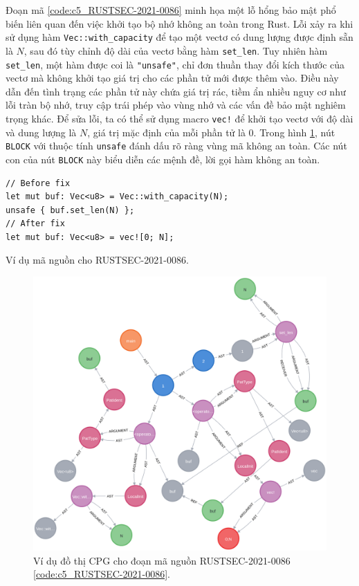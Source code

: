 Đoạn mã \ref{code:c5_RUSTSEC-2021-0086} minh họa một lỗ hổng bảo mật phổ biến liên quan đến việc khởi tạo bộ nhớ không an toàn trong Rust.
Lỗi xảy ra khi sử dụng hàm \texttt{Vec::with\_capacity} để tạo một vectơ có dung lượng được định sẵn là $N$, sau đó tùy chỉnh độ dài của vectơ bằng hàm \texttt{set\_len}.
Tuy nhiên hàm \texttt{set\_len}, một hàm được coi là \texttt{"unsafe"}, chỉ đơn thuần thay đổi kích thước của vectơ mà không khởi tạo giá trị cho các phần tử mới được thêm vào.
Điều này dẫn đến tình trạng các phần tử này chứa giá trị rác, tiềm ẩn nhiều nguy cơ như lỗi tràn bộ nhớ, truy cập trái phép vào vùng nhớ và các vấn đề bảo mật nghiêm trọng khác.
Để sửa lỗi, ta có thể sử dụng macro \texttt{vec!} để khởi tạo vectơ với độ dài và dung lượng là $N$, giá trị mặc định của mỗi phần tử là $0$.
Trong hình \ref{img:c5_RUSTSEC-2021-0086}, nút \texttt{BLOCK} với thuộc tính \texttt{unsafe} đánh dấu rõ ràng vùng mã không an toàn.
Các nút con của nút \texttt{BLOCK} này biểu diễn các mệnh đề, lời gọi hàm không an toàn.

\begin{listing}[H]
\begin{verbatim}
// Before fix
let mut buf: Vec<u8> = Vec::with_capacity(N);
unsafe { buf.set_len(N) };
// After fix
let mut buf: Vec<u8> = vec![0; N];
\end{verbatim}
\caption{Ví dụ mã nguồn cho RUSTSEC-2021-0086.}
\label{code:c5_RUSTSEC-2021-0086}
\end{listing}

\begin{figure}[H]
    \includegraphics[width=1\columnwidth]{figures/c5/c5_RUSTSEC-2021-0086}
    \centering
    \caption{Ví dụ đồ thị CPG cho đoạn mã nguồn RUSTSEC-2021-0086 \ref{code:c5_RUSTSEC-2021-0086}.}
    \label{img:c5_RUSTSEC-2021-0086}
\end{figure}

